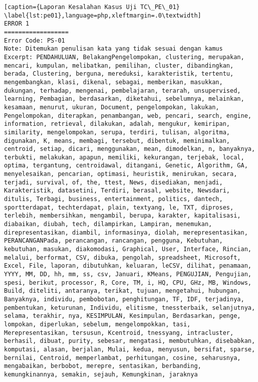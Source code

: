 \begin{enumerate}
\begin{lstlisting}[caption={Laporan Kesalahan Kasus Uji TC\_PE\_01}	\label{lst:pe01},language=php,xleftmargin=.0\textwidth]
ERROR 1
==================
Error Code: PS-01
Note: Ditemukan penulisan kata yang tidak sesuai dengan kamus
Excerpt: PENDAHULUAN, BelakangPengelompokan, clustering, merupakan, mencari, kumpulan, melibatkan, pemilihan, cluster, dibandingkan, berada, Clustering, berguna, mereduksi, karakteristik, tertentu, mengembangkan, klasi, dikenal, sebagai, memberikan, masukkan, dukungan, terhadap, mengenai, pembelajaran, terarah, unsupervised, learning, Pembagian, berdasarkan, diketahui, sebelumnya, melainkan, kesamaan, menurut, ukuran, Document, pengelompokan, lakukan, Pengelompokan, diterapkan, penambangan, web, pencari, search, engine, information, retrieval, dilakukan, adalah, mengukur, kemiripan, similarity, mengelompokan, serupa, terdiri, tulisan, algoritma, digunakan, K, means, membagi, tersebut, dibentuk, meminimalkan, centroid, setiap, dicari, menggunakan, mean, dimodelkan, n, banyaknya, terbukti, melakukan, apapun, memiliki, kekurangan, terjebak, local, optima, tergantung, centroidawal, ditangani, Genetic, Algorithm, GA, menyelesaikan, pencarian, optimasi, heuristik, menirukan, secara, terjadi, survival, of, the, ttest, News, disediakan, menjadi, Karakteristik, datasetini, Terdiri, berasal, website, Newsdari, ditulis, Terbagi, business, entertainment, politics, dantech, sportterdapat, techterdapat, plain, textyang, le, TXT, diproses, terlebih, membersihkan, mengambil, berupa, karakter, kapitalisasi, diabaikan, diubah, tech, dilampirkan, Lampiran, menemukan, direpresentasikan, diambil, informasinya, diolah, merepresentasikan, PERANCANGANPada, perancangan, rancangan, pengguna, Kebutuhan, kebutuhan, masukan, diakomodasi, Graphical, User, Interface, Rincian, melalui, berformat, CSV, dibuka, pengolah, spreadsheet, Microsoft, Excel, File, laporan, dibutuhkan, keluaran, leCSV, dilihat, penamaan, YYYY, MM, DD, hh, mm, ss, csv, Januari, KMeans, PENGUJIAN, Pengujian, spesi, berikut, processor, R, Core, TM, i, HQ, CPU, GHz, MB, Windows, Build, diteliti, antaranya, terikat, tujuan, mengetahui, hubungan, Banyaknya, individu, pembobotan, penghitungan, TF, IDF, terjadinya, pembentukan, keturunan, Individu, elitisme, tnessterbaik, selanjutnya, selama, terakhir, nya, KESIMPULAN, Kesimpulan, Berdasarkan, penge, lompokan, diperlukan, sebelum, mengelompokkan, tasi, Merepresentasikan, tersusun, Kcentroid, tnessyang, intracluster, berhasil, dibuat, purity, sebesar, mengatasi, membutuhkan, disebabkan, komputasi, alasan, berjalan, Mulai, kedua, menyusun, bersifat, sparse, bernilai, Centroid, memperlambat, perhitungan, cosine, seharusnya, mengabaikan, berbobot, merepre, sentasikan, berbanding, kemungkinannya, semakin, sejauh, Kemungkinan, jaraknya


\end{lstlisting}
\end{enumerate}
